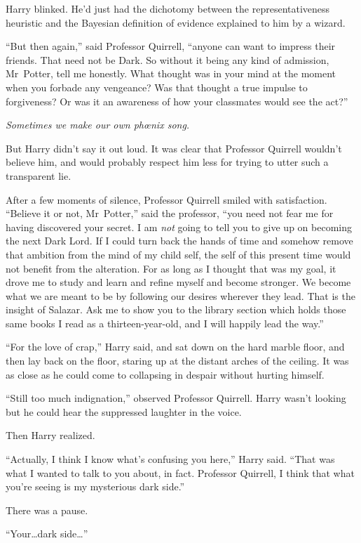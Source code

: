 Harry blinked. He’d just had the dichotomy between the representativeness heuristic and the Bayesian definition of evidence explained to him by a wizard.

“But then again,” said Professor Quirrell, “anyone can want to impress their friends. That need not be Dark. So without it being any kind of admission, Mr~Potter, tell me honestly. What thought was in your mind at the moment when you forbade any vengeance? Was that thought a true impulse to forgiveness? Or was it an awareness of how your classmates would see the act?”

\emph{Sometimes we make our own phœnix song.}

But Harry didn’t say it out loud. It was clear that Professor Quirrell wouldn’t believe him, and would probably respect him less for trying to utter such a transparent lie.

After a few moments of silence, Professor Quirrell smiled with satisfaction. “Believe it or not, Mr~Potter,” said the professor, “you need not fear me for having discovered your secret. I am \emph{not} going to tell you to give up on becoming the next Dark Lord. If I could turn back the hands of time and somehow remove that ambition from the mind of my child self, the self of this present time would not benefit from the alteration. For as long as I thought that was my goal, it drove me to study and learn and refine myself and become stronger. We become what we are meant to be by following our desires wherever they lead. That is the insight of Salazar. Ask me to show you to the library section which holds those same books I read as a thirteen-year-old, and I will happily lead the way.”

“For the love of crap,” Harry said, and sat down on the hard marble floor, and then lay back on the floor, staring up at the distant arches of the ceiling. It was as close as he could come to collapsing in despair without hurting himself.

“Still too much indignation,” observed Professor Quirrell. Harry wasn’t looking but he could hear the suppressed laughter in the voice.

Then Harry realized.

“Actually, I think I know what’s confusing you here,” Harry said. “That was what I wanted to talk to you about, in fact. Professor Quirrell, I think that what you’re seeing is my mysterious dark side.”

There was a pause.

“Your…dark side…”

